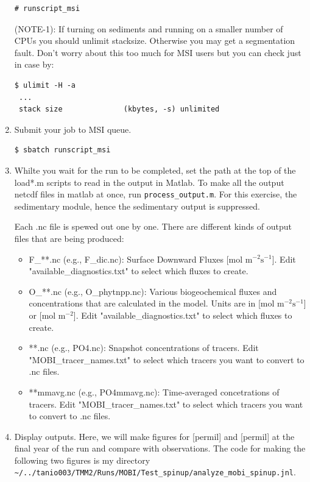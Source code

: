 \documentclass[a4paper]{article}
\def\noin{\noindent }
\begin{document}
\begin{enumerate}
\lstset{language=sh} 
\begin{lstlisting}[frame=single,basicstyle=\scriptsize,commentstyle=\color{blue}]
 # runscript_msi
\end{lstlisting}
\noin (NOTE-1): If turning on sediments and running on a smaller number of CPUs you should unlimit stacksize. Otherwise you may get a segmentation fault. Don't worry about this too much for MSI users but you can check just in case by:
\begin{lstlisting}[style=DOS]
 $ ulimit -H -a
 ...
 stack size              (kbytes, -s) unlimited
\end{lstlisting}

\item Submit your job to MSI queue.
\begin{lstlisting}[style=DOS]
 $ sbatch runscript_msi
\end{lstlisting}

\item Whilte you wait for the run to be completed, set the path at the top of the load*.m scripts to read in the output in Matlab. To make all the output netcdf files in matlab at once, run \verb|process_output.m|. For this exercise, the sedimentary module, hence the sedimentary output is suppressed. 

\noin Each .nc file is spewed out one by one. There are different kinds of output files that are being produced:
\begin{itemize}
 \item F\_**.nc (e.g., F\_dic.nc): Surface Downward Fluxes [mol $\mathrm{m^{-2} s^{-1}}$]. Edit "available\_diagnostics.txt" to select which fluxes to create.
 \item O\_**.nc (e.g., O\_phytnpp.nc): Various biogeochemical fluxes and concentrations that are calculated in the model. Units are in [mol $\mathrm{m^{-2} s^{-1}}$] or [mol $\mathrm{m^{-2}}$]. Edit "available\_diagnostics.txt" to select which fluxes to create.
 \item **.nc (e.g., PO4.nc): Snapshot concentrations of tracers. Edit "MOBI\_tracer\_names.txt" to select which tracers you want to convert to .nc files.
 \item **mmavg.nc (e.g., PO4mmavg.nc): Time-averaged concetrations of tracers. Edit "MOBI\_tracer\_names.txt" to select which tracers you want to convert to .nc files.
\end{itemize}

\item Display outputs. Here, we will make figures for \Delta{} [permil] and \delta{} [permil] at the final year of the run and compare with observations. The code for making the following two figures is my directory \verb|~/../tanio003/TMM2/Runs/MOBI/Test_spinup/analyze_mobi_spinup.jnl|.


\end{enumerate}
\end{document}
